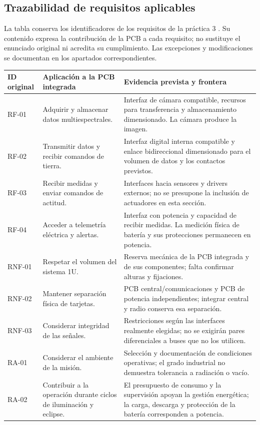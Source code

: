 \documentclass[11pt,letterpaper]{article}
\begin{document}
\subsection{Trazabilidad de requisitos aplicables}
La tabla conserva los identificadores de los requisitos de la práctica 3 \cite{lab3}. Su contenido expresa la contribución de la PCB a cada
requisito; no sustituye el enunciado original ni acredita su cumplimiento.
Las excepciones y modificaciones se documentan en los apartados correspondientes.
\small
\begin{longtable}{L{1.7cm}L{5.6cm}L{7.1cm}}
\toprule ID original & Aplicación a la PCB integrada & Evidencia prevista y frontera \\
\midrule\endhead
RF-01 & Adquirir y almacenar datos multiespectrales. & Interfaz de cámara compatible, recursos para transferencia y almacenamiento dimensionado. La cámara produce la imagen. \\
RF-02 & Transmitir datos y recibir comandos de tierra. & Interfaz digital interna compatible y enlace bidireccional dimensionado para el volumen de datos y los contactos previstos. \\
RF-03 & Recibir medidas y enviar comandos de actitud. & Interfaces hacia sensores y drivers externos; no se presupone la inclusión de actuadores en esta sección. \\
RF-04 & Acceder a telemetría eléctrica y alertas. & Interfaz con potencia y capacidad de recibir medidas. La medición física de batería y sus protecciones permanecen en potencia. \\
RNF-01 & Respetar el volumen del sistema 1U. & Reserva mecánica de la PCB integrada y de sus componentes; falta confirmar alturas y fijaciones. \\
RNF-02 & Mantener separación física de tarjetas. & PCB central/comunicaciones y PCB de potencia independientes; integrar central y radio conserva esa separación. \\
RNF-03 & Considerar integridad de las señales. & Restricciones según las interfaces realmente elegidas; no se exigirán pares diferenciales a buses que no los utilicen. \\
RA-01 & Considerar el ambiente de la misión. & Selección y documentación de condiciones operativas; el grado industrial no demuestra tolerancia a radiación o vacío. \\
RA-02 & Contribuir a la operación durante ciclos de iluminación y eclipse. & El presupuesto de consumo y la supervisión apoyan la gestión energética; la carga, descarga y protección de la batería corresponden a potencia. \\

\end{longtable}
\end{document}

